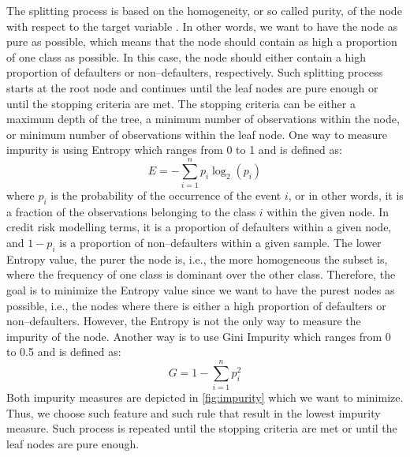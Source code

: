The splitting process is based on the homogeneity, or so called purity, of the node with respect to the target variable \citep{provost2013data}.
In other words, we want to have the node as pure as possible, which means that the node should contain as high a proportion of one class as possible.
In this case, the node should either contain a high proportion of defaulters or non--defaulters, respectively.
Such splitting process starts at the root node and continues until the leaf nodes are pure enough or until the stopping criteria are met.
The stopping criteria can be either a maximum depth of the tree, a minimum number of observations within the node, or minimum number of observations within the leaf node.
One way to measure impurity is using Entropy which ranges from 0 to 1 and is defined as:
\begin{equation}\label{eq}
    E = -\sum_{i=1}^{n} p_i \log_2 \left(p_i\right)
    \end{equation}
where $p_i$ is the probability of the occurrence of the event $i$, or in other words, it is a fraction of the observations belonging to the class $i$ within the given node. In credit risk modelling terms, it is a proportion of defaulters within a given node, and $1-p_i$ is a proportion of non--defaulters within a given sample.
The lower Entropy value, the purer the node is, i.e., the more homogeneous the subset is, where the frequency of one class is dominant over the other class.
Therefore, the goal is to minimize the Entropy value since we want to have the purest nodes as possible, i.e., the nodes where there is either a high proportion of defaulters or non--defaulters.
However, the Entropy is not the only way to measure the impurity of the node. Another way is to use Gini Impurity which ranges from 0 to 0.5 and is defined as:
\begin{equation}\label{eq}
    G = 1 - \sum_{i=1}^{n} p_{i}^{2}
\end{equation}
Both impurity measures are depicted in \autoref{fig:impurity} which we want to minimize. Thus, we choose such feature and such rule that result in the lowest impurity measure. Such process is repeated until the stopping criteria are met or until the leaf nodes are pure enough.
